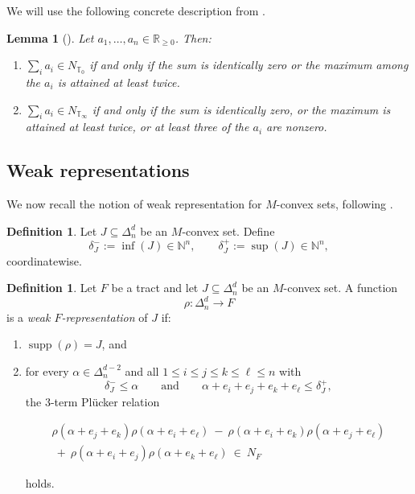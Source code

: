 \documentclass[12pt]{amsart}
\newtheorem{lemma}[theorem]{Lemma}
\theoremstyle{definition}
\newtheorem{definition}[theorem]{Definition}
\newcommand{\1}{\mathbf{1}}
\DeclareMathOperator{\supp}{supp}
\newcommand\N{{\mathbb N}}
\newcommand\R{{\mathbb R}}
\newcommand\T{{\mathbb T}}
\begin{document}
We will use the following concrete description from \cite{BHKL1}.

\begin{lemma}[{\cite[Lemma 3.9]{BHKL1}}]
\label{lem:T0-Tinfty}
Let $a_1,\dots,a_n\in \R_{\ge 0}$. Then:
\begin{enumerate}
\item $\sum_i a_i \in N_{\T_0}$ if and only if the sum is identically zero or the
maximum among the $a_i$ is attained at least twice.
\item $\sum_i a_i \in N_{\T_\infty}$ if and only if the sum is identically zero, or the
maximum is attained at least twice, or at least three of the $a_i$ are nonzero.
\end{enumerate}
\end{lemma}

\subsection{Weak representations}

We now recall the notion of weak representation for $M$-convex sets, following
\cite{BHKL0}.

\begin{definition}
Let $J\subseteq \Delta_n^d$ be an $M$-convex set. Define
\[
\delta_J^- := \inf(J)\in \N^n,
\qquad
\delta_J^+ := \sup(J)\in \N^n,
\]
coordinatewise.
\end{definition}

\begin{definition}
Let $F$ be a tract and let $J\subseteq \Delta_n^d$ be an $M$-convex set.
A function
\[
\rho:\Delta_n^d \to F
\]
is a \emph{weak $F$-representation} of $J$ if:
\begin{enumerate}
\item $\supp(\rho)=J$, and
\item for every $\alpha\in \Delta_n^{d-2}$ and all $1\le i\le j\le k\le \ell\le n$
with
\[
\delta_J^- \le \alpha
\qquad\text{and}\qquad
\alpha + e_i+e_j+e_k+e_\ell \le \delta_J^+,
\]
the $3$-term Pl\"ucker relation
\begin{samepage}
\begin{multline*}
\rho(\alpha+e_j+e_k)\rho(\alpha+e_i+e_\ell)
\ - \
\rho(\alpha+e_i+e_k)\rho(\alpha+e_j+e_\ell)\\
\ + \
\rho(\alpha+e_i+e_j)\rho(\alpha+e_k+e_\ell)
\ \in \ N_F
\end{multline*}
\end{samepage}
holds.
\end{enumerate}
\end{definition}
\end{document}
